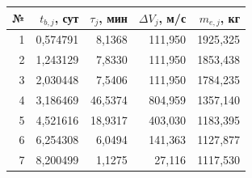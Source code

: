 \begin{tabular}{@{}rrrrr@{}}
\toprule
№ & $t_{b,j}$, сут & $\tau_j$, мин & $\Delta V_j$, м/с & $m_{e,j}$, кг \\
\midrule
1 & 0{,}574791 & 8{,}1368 & 111{,}950 & 1925{,}325 \\
2 & 1{,}243129 & 7{,}8330 & 111{,}950 & 1853{,}438 \\
3 & 2{,}030448 & 7{,}5406 & 111{,}950 & 1784{,}235 \\
4 & 3{,}186469 & 46{,}5374 & 804{,}959 & 1357{,}140 \\
5 & 4{,}521616 & 18{,}9317 & 403{,}030 & 1183{,}395 \\
6 & 6{,}254308 & 6{,}0494 & 141{,}363 & 1127{,}877 \\
7 & 8{,}200499 & 1{,}1275 & 27{,}116 & 1117{,}530 \\
\bottomrule
\end{tabular}
